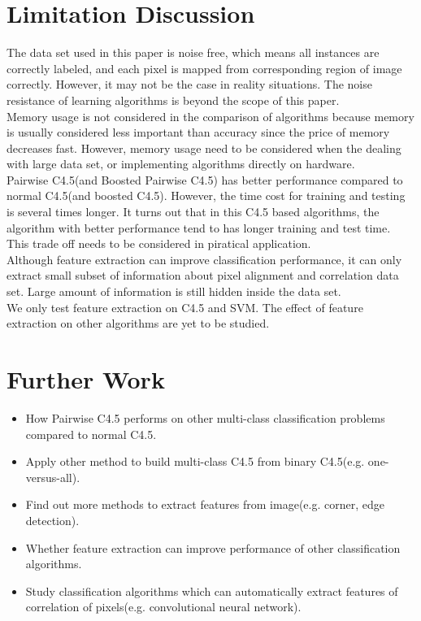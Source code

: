 \documentclass[a4paper,11pt]{nurop}
\begin{document}
\section{Limitation Discussion}
The data set used in this paper is noise free, which means all instances are correctly labeled, and each pixel is mapped from corresponding region of image correctly. However, it may not be the case in reality situations. The noise resistance of learning algorithms is beyond the scope of this paper.\\
Memory usage is not considered in the comparison of algorithms because memory is usually considered less important than accuracy since the price of memory decreases fast. However, memory usage need to be considered when the dealing with large data set, or implementing algorithms directly on hardware.\\
Pairwise C4.5(and Boosted Pairwise C4.5) has better performance compared to normal C4.5(and boosted C4.5). However, the time cost for training and testing is several times longer. It turns out that in this C4.5 based algorithms, the algorithm with better performance tend to has longer training and test time. This trade off needs to be considered in piratical application.\\
Although feature extraction can improve classification performance, it can only extract small subset of information about pixel alignment and correlation data set. Large amount of information is still hidden inside the data set.\\
We only test feature extraction on C4.5 and SVM. The effect of feature extraction on other algorithms are yet to be studied.\\

\section{Further Work}
\begin{itemize}
 \item How Pairwise C4.5 performs on other multi-class classification problems compared to normal C4.5.
 \item Apply other method to build multi-class C4.5 from binary C4.5(e.g. one-versus-all).
 \item Find out more methods to extract features from image(e.g. corner, edge detection).
 \item Whether feature extraction can improve performance of other classification algorithms.
 \item Study classification algorithms which can automatically extract features of correlation of pixels(e.g. convolutional neural network\cite{lecun98}).
\end{itemize}
\end{document}
